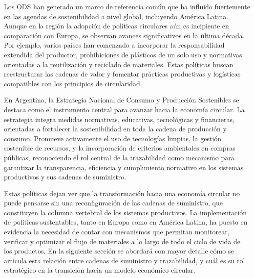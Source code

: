 Los ODS han generado un marco de referencia común que ha influido fuertemente en las agendas de sostenibilidad a nivel global, incluyendo América Latina. Aunque en la región la adopción de políticas circulares aún es incipiente en comparación con Europa, se observan avances significativos en la última década. Por ejemplo, varios países han comenzado a incorporar la responsabilidad extendida del productor, prohibiciones de plásticos de un solo uso y normativas orientadas a la reutilización y reciclado de materiales. Estas políticas buscan reestructurar las cadenas de valor y fomentar prácticas productivas y logísticas compatibles con los principios de circularidad.

En Argentina, la Estrategia Nacional de Consumo y Producción Sostenibles se destaca como el instrumento central para avanzar hacia la economía circular. La estrategia integra medidas normativas, educativas, tecnológicas y financieras, orientadas a fortalecer la sostenibilidad en toda la cadena de producción y consumo. Promueve activamente el uso de tecnologías limpias, la gestión sostenible de recursos, y la incorporación de criterios ambientales en compras públicas, reconociendo el rol central de la trazabilidad como mecanismo para garantizar la transparencia, eficiencia y cumplimiento normativo en los sistemas productivos y sus cadenas de suministro.


Estas políticas dejan ver que la transformación hacia una economía circular no puede pensarse sin una reconfiguración de las cadenas de suministro, que constituyen la columna vertebral de los sistemas productivos. La implementación de políticas sustentables, tanto en Europa como en América Latina, ha puesto en evidencia la necesidad de contar con mecanismos que permitan monitorear, verificar y optimizar el flujo de materiales a lo largo de todo el ciclo de vida de los productos. En la siguiente sección se abordará con mayor detalle cómo se articula esta relación entre cadenas de suministro y trazabilidad, y cuál es su rol estratégico en la transición hacia un modelo económico circular.

